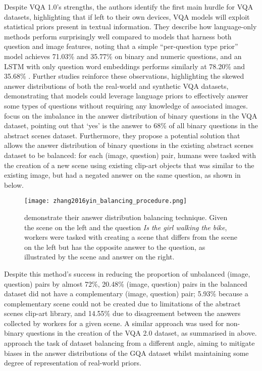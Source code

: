 Despite VQA 1.0's strengths, the authors identify the first main hurdle for VQA datasets, highlighting that if left to their own devices, VQA models will exploit statistical priors present in textual information. They describe how language-only methods perform surprisingly well compared to models that harness both question and image features, noting that a simple ``per-question type prior'' model achieves 71.03\% and 35.77\% on binary and numeric questions, and an LSTM with only question word embeddings performs similarly at 78.20\% and 35.68\%  \cite{antol2015vqa}. Further studies \cite{goyal2017making, zhang2016yin} reinforce these observations, highlighting the skewed answer distributions of both the real-world and synthetic VQA datasets, demonstrating that models could leverage language priors to effectively answer some types of questions without requiring any knowledge of associated images. \citeauthor{zhang2016yin} focus on the imbalance in the answer distribution of binary questions in the VQA dataset, pointing out that `yes' is the answer to 68\% of all binary questions in the abstract scenes dataset. Furthermore, they propose a potential solution that allows the answer distribution of binary questions in the existing abstract scenes dataset to be balanced: for each (image, question) pair, humans were tasked with the creation of a new scene using existing clip-art objects \cite{zitnick2013bringing} that was similar to the existing image, but had a negated answer on the same question, as shown in \figureautorefname{  \ref{fig:zhang2016yin_balancing_procedure}} below.

\begin{figure}[H]
    \centering
    \texttt{[image: zhang2016yin\_balancing\_procedure.png]}
    \caption{\citeauthor{zhang2016yin} demonstrate their answer distribution balancing technique. Given the scene on the left and the question \textit{Is the girl walking the bike}, workers were tasked with creating a scene that differs from the scene on the left but has the opposite answer to the question, as illustrated by the scene and answer on the right.}
    \label{fig:zhang2016yin_balancing_procedure}
\end{figure}

Despite this method's success in reducing the proportion of unbalanced (image, question) pairs by almost 72\%, 20.48\% (image, question) pairs in the balanced dataset did not have a complementary (image, question) pair; 5.93\% because a complementary scene could not be created due to limitations of the abstract scenes clip-art library, and 14.55\% due to disagreement between the answers collected by workers for a given scene. A similar approach was used for non-binary questions in the creation of the VQA 2.0 dataset, as summarised in \tableautorefname{  \ref{tab:dataset_comparison}} above. \citeauthor{hudson2019gqa} approach the task of dataset balancing from a different angle, aiming to mitigate biases in the answer distributions of the GQA dataset whilst maintaining some degree of representation of real-world priors.

